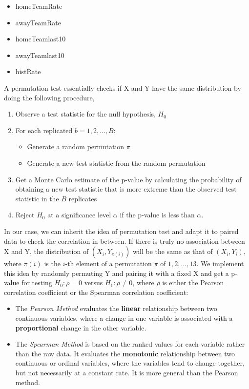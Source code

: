 \documentclass[]{article}
\providecommand{\tightlist}{%
  \setlength{\itemsep}{0pt}\setlength{\parskip}{0pt}}
\begin{document}
\begin{itemize}
\tightlist
\item
  homeTeamRate
\item
  awayTeamRate
\item
  homeTeamlast10
\item
  awayTeamlast10
\item
  histRate
\end{itemize}

A permutation test essentially checks if X and Y have the same
distribution by doing the following procedure,

\begin{enumerate}
\def\labelenumi{\arabic{enumi}.}
\tightlist
\item
  Observe a test statistic for the null hypothesis, \(H_0\)
\item
  For each replicated \(b = 1, 2,..., B\):

  \begin{itemize}
  \tightlist
  \item
    Generate a random permutation \(\pi\)
  \item
    Generate a new test statistic from the random permutation
  \end{itemize}
\item
  Get a Monte Carlo estimate of the p-value by calculating the
  probability of obtaining a new test statistic that is more extreme
  than the observed test statistic in the \(B\) replicates
\item
  Reject \(H_0\) at a significance level \(\alpha\) if the p-value is
  less than \(\alpha\).
\end{enumerate}

In our case, we can inherit the idea of permutation test and adapt it to
paired data to check the correlation in between. If there is truly no
association between X and Y, the distribution of \((X_i, Y_{\pi(i)})\)
will be the same as that of \((X_i, Y_i)\), where \(\pi(i)\) is the
\(i\)-th element of a permutation \(\pi\) of \({1, 2, ..., 13}\). We
implement this idea by randomly permuting Y and pairing it with a fixed
X and get a p-value for testing \(H_0: \rho = 0\) versus
\(H_1: \rho \neq 0\), where \(\rho\) is either the Pearson correlation
coefficient or the Spearman correlation coefficient:

\begin{itemize}
\item
  The \emph{Pearson Method} evaluates the \textbf{linear} relationship
  between two continuous variables, where a change in one variable is
  associated with a \textbf{proportional} change in the other variable.
\item
  The \emph{Spearman Method} is based on the ranked values for each
  variable rather than the raw data. It evaluates the \textbf{monotonic}
  relationship between two continuous or ordinal variables, where the
  variables tend to change together, but not necessarily at a constant
  rate. It is more general than the Pearson method.
\end{itemize}
\end{document}
